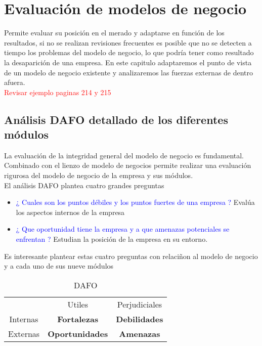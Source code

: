 \documentclass[11pt]{book}
\begin{document}
\chapter{Evaluación de modelos de negocio}
Permite evaluar su posición en el merado y adaptarse en función de los resultados, si no se realizan revisiones frecuentes es posible que no se detecten a tiempo los problemas del modelo de negocio, lo que podría tener como resultado la desaparición de una empresa.
En este capitulo adaptaremos el punto de vista de un modelo de negocio existente y analizaremos las fuerzas externas de dentro afuera. \\
\textcolor{red}{Revisar ejemplo paginas 214 y 215}
\section{Análisis DAFO detallado de los diferentes módulos}
La evaluación de la integridad general del modelo de negocio es fundamental. Combinado con el lienzo de modelo de negocios permite realizar una evaluación rigurosa del modelo de negocio de la empresa y sus módulos.
\\ El análisis DAFO plantea cuatro grandes preguntas
\begin{itemize}
\item\textcolor{blue}{ ¿ Cuales son los puntos débiles y los puntos fuertes de una empresa ? }
Evalúa los aspectos internos de la empresa
\item\textcolor{blue}{ ¿ Que oportunidad tiene la empresa y a que amenazas potenciales se enfrentan ? }
Estudian la posición de la empresa en su entorno. 
\end{itemize}
Es interesante plantear estas cuatro preguntas con relaciñon al modelo de negocio y a cada uno de sus nueve módulos
\begin{table}[htbp]
  \centering
  \caption{DAFO}
    \begin{tabular}{c|cc}
    \multicolumn{1}{c}{} & Utiles & Perjudiciales \\
\cmidrule{2-3}    Internas & \textbf{Fortalezas} & \textbf{Debilidades} \\
    Externas & \textbf{Oportunidades} & \textbf{Amenazas} \\
    \end{tabular}%
  \label{tab:addlabel}%
\end{table}%
\end{document}
